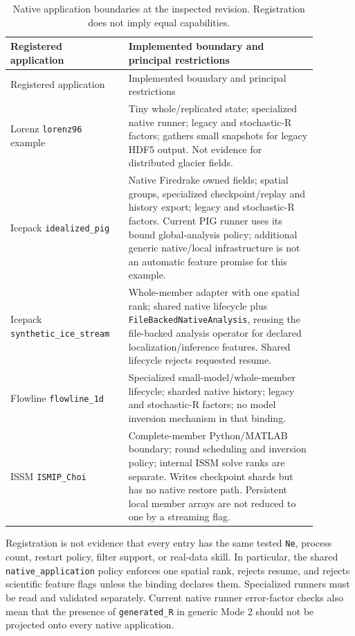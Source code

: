 \documentclass[11pt,a4paper]{article}
\newcommand{\code}[1]{\nolinkurl{#1}}
\begin{document}
\begingroup\small\setlength{\tabcolsep}{3pt}
\begin{longtable}{p{0.31\linewidth}p{0.57\linewidth}}
\caption{Native application boundaries at the inspected revision. Registration does not imply equal capabilities.}\label{tab:nativecapabilities}\\
\toprule
Registered application & Implemented boundary and principal restrictions\\\midrule\endfirsthead
\toprule Registered application & Implemented boundary and principal restrictions\\\midrule\endhead
Lorenz \code{lorenz96} example & Tiny whole/replicated state; specialized native runner; legacy and stochastic-R factors; gathers small snapshots for legacy HDF5 output. Not evidence for distributed glacier fields.\\
Icepack \code{idealized_pig} & Native Firedrake owned fields; spatial groups, specialized checkpoint/replay and history export; legacy and stochastic-R factors. Current PIG runner uses its bound global-analysis policy; additional generic native/local infrastructure is not an automatic feature promise for this example.\\
Icepack \code{synthetic_ice_stream} & Whole-member adapter with one spatial rank; shared native lifecycle plus \code{FileBackedNativeAnalysis}, reusing the file-backed analysis operator for declared localization/inference features. Shared lifecycle rejects requested resume.\\
Flowline \code{flowline_1d} & Specialized small-model/whole-member lifecycle; sharded native history; legacy and stochastic-R factors; no model inversion mechanism in that binding.\\
ISSM \code{ISMIP_Choi} & Complete-member Python/MATLAB boundary; round scheduling and inversion policy; internal ISSM solve ranks are separate. Writes checkpoint shards but has no native restore path. Persistent local member arrays are not reduced to one by a streaming flag.\\
\bottomrule\end{longtable}\endgroup


Registration is not evidence that every entry has the same tested \code{Ne}, process count, restart policy, filter support, or real-data skill. In particular, the shared \code{native_application} policy enforces one spatial rank, rejects resume, and rejects scientific feature flags unless the binding declares them. Specialized runners must be read and validated separately. Current native runner error-factor checks also mean that the presence of \code{generated_R} in generic Mode 2 should not be projected onto every native application.
\end{document}
